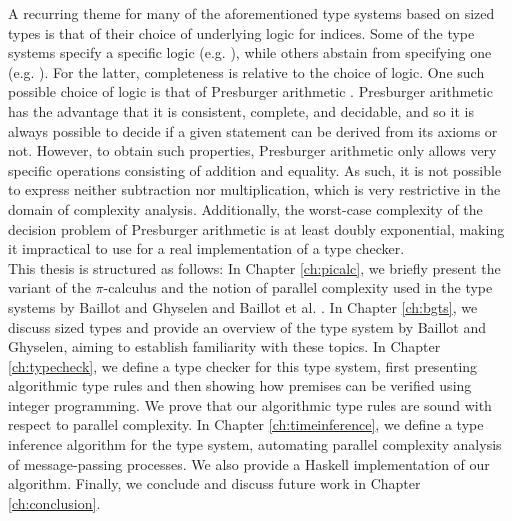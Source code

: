 A recurring theme for many of the aforementioned type systems based on sized types is that of their choice of underlying logic for indices. Some of the type systems specify a specific logic (e.g. \cite{HughesEtAl1996,HofmannAndJost2003,HofmannAndHoffmann2010,HoffmannEtAl2012}), while others abstain from specifying one (e.g. \cite{BaillotGhyselen2021,BaillotEtAl2021,DalLagoGaboardi2011}). For the latter, completeness is relative to the choice of logic. One such possible choice of logic is that of Presburger arithmetic \cite{PresburgerArithmetic}. Presburger arithmetic has the advantage that it is consistent, complete, and decidable, and so it is always possible to decide if a given statement can be derived from its axioms or not. However, to obtain such properties, Presburger arithmetic only allows very specific operations consisting of addition and equality. As such, it is not possible to express neither subtraction nor multiplication, which is very restrictive in the domain of complexity analysis. Additionally, the worst-case complexity of the decision problem of Presburger arithmetic is at least doubly exponential, making it impractical to use for a real implementation of a type checker.\\

This thesis is structured as follows: In Chapter \ref{ch:picalc}, we briefly present the variant of the $\pi$-calculus and the notion of parallel complexity used in the type systems by Baillot and Ghyselen \cite{BaillotGhyselen2021} and Baillot et al. \cite{BaillotEtAl2021}. In Chapter \ref{ch:bgts}, we discuss sized types and provide an overview of the type system by Baillot and Ghyselen, aiming to establish familiarity with these topics. In Chapter \ref{ch:typecheck}, we define a type checker for this type system, first presenting algorithmic type rules and then showing how premises can be verified using integer programming. We prove that our algorithmic type rules are sound with respect to parallel complexity. In Chapter \ref{ch:timeinference}, we define a type inference algorithm for the type system, automating parallel complexity analysis of message-passing processes. We also provide a Haskell implementation of our algorithm. Finally, we conclude and discuss future work in Chapter \ref{ch:conclusion}.


